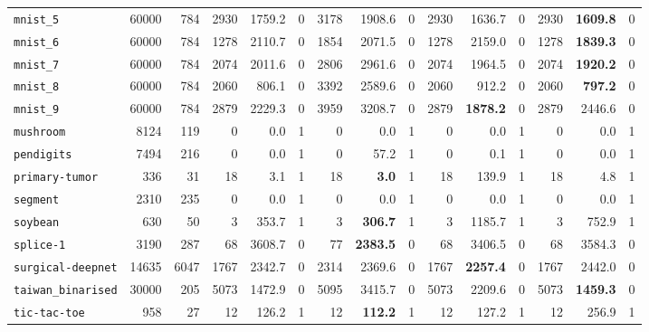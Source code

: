 \begin{tabular}{lccrrrrrrrrrrrr}
\texttt{mnist\_5} & \multicolumn{1}{r}{60000} & \multicolumn{1}{r}{784}  & 2930 & 1759.2 & 0 & 3178 & 1908.6 & 0 & 2930 & 1636.7 & 0 & 2930 & \textbf{1609.8} & 0\\
\texttt{mnist\_6} & \multicolumn{1}{r}{60000} & \multicolumn{1}{r}{784}  & 1278 & 2110.7 & 0 & 1854 & 2071.5 & 0 & 1278 & 2159.0 & 0 & 1278 & \textbf{1839.3} & 0\\
\texttt{mnist\_7} & \multicolumn{1}{r}{60000} & \multicolumn{1}{r}{784}  & 2074 & 2011.6 & 0 & 2806 & 2961.6 & 0 & 2074 & 1964.5 & 0 & 2074 & \textbf{1920.2} & 0\\
\texttt{mnist\_8} & \multicolumn{1}{r}{60000} & \multicolumn{1}{r}{784}  & 2060 & 806.1 & 0 & 3392 & 2589.6 & 0 & 2060 & 912.2 & 0 & 2060 & \textbf{797.2} & 0\\
\texttt{mnist\_9} & \multicolumn{1}{r}{60000} & \multicolumn{1}{r}{784}  & 2879 & 2229.3 & 0 & 3959 & 3208.7 & 0 & 2879 & \textbf{1878.2} & 0 & 2879 & 2446.6 & 0\\
\texttt{mushroom} & \multicolumn{1}{r}{8124} & \multicolumn{1}{r}{119}  & 0 & 0.0 & 1 & 0 & 0.0 & 1 & 0 & 0.0 & 1 & 0 & 0.0 & 1\\
\texttt{pendigits} & \multicolumn{1}{r}{7494} & \multicolumn{1}{r}{216}  & 0 & 0.0 & 1 & 0 & 57.2 & 1 & 0 & 0.1 & 1 & 0 & 0.0 & 1\\
\texttt{primary-tumor} & \multicolumn{1}{r}{336} & \multicolumn{1}{r}{31}  & 18 & 3.1 & 1 & 18 & \textbf{3.0} & 1 & 18 & 139.9 & 1 & 18 & 4.8 & 1\\
\texttt{segment} & \multicolumn{1}{r}{2310} & \multicolumn{1}{r}{235}  & 0 & 0.0 & 1 & 0 & 0.0 & 1 & 0 & 0.0 & 1 & 0 & 0.0 & 1\\
\texttt{soybean} & \multicolumn{1}{r}{630} & \multicolumn{1}{r}{50}  & 3 & 353.7 & 1 & 3 & \textbf{306.7} & 1 & 3 & 1185.7 & 1 & 3 & 752.9 & 1\\
\texttt{splice-1} & \multicolumn{1}{r}{3190} & \multicolumn{1}{r}{287}  & 68 & 3608.7 & 0 & 77 & \textbf{2383.5} & 0 & 68 & 3406.5 & 0 & 68 & 3584.3 & 0\\
\texttt{surgical-deepnet} & \multicolumn{1}{r}{14635} & \multicolumn{1}{r}{6047}  & 1767 & 2342.7 & 0 & 2314 & 2369.6 & 0 & 1767 & \textbf{2257.4} & 0 & 1767 & 2442.0 & 0\\
\texttt{taiwan\_binarised} & \multicolumn{1}{r}{30000} & \multicolumn{1}{r}{205}  & 5073 & 1472.9 & 0 & 5095 & 3415.7 & 0 & 5073 & 2209.6 & 0 & 5073 & \textbf{1459.3} & 0\\
\texttt{tic-tac-toe} & \multicolumn{1}{r}{958} & \multicolumn{1}{r}{27}  & 12 & 126.2 & 1 & 12 & \textbf{112.2} & 1 & 12 & 127.2 & 1 & 12 & 256.9 & 1\\

\end{tabular}
